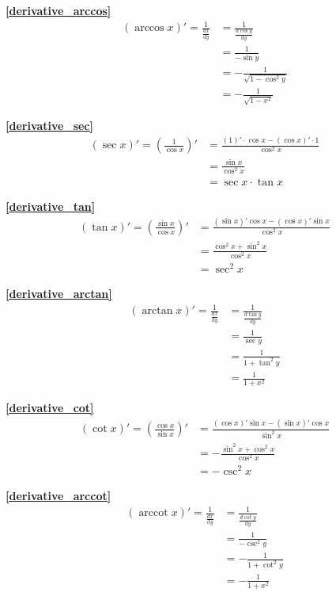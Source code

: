 \textbf{\large \ref{derivative_arccos}}
\begin{align*}
        (\arccos x)'=\frac{1}{\frac{dx}{\mathrm{d}{y}}}&=\frac{1}{\frac{d\cos y}{\mathrm{d}{y}}}\\
        &=\frac{1}{-\sin y}\\
        &=-\frac{1}{\sqrt{1-\cos^2 y}}\\
        &=-\frac{1}{\sqrt{1-x^2}}
\end{align*}

\textbf{\large \ref{derivative_sec}}
\begin{align*}
        (\sec x)'=\left(\frac{1}{\cos x}\right)'&=\frac{(1)'\cdot\cos x-(\cos x)'\cdot 1}{\cos^2x}\\
        &=\frac{\sin x}{\cos^2x}\\
        &=\sec x\cdot\tan x
\end{align*}

\textbf{\large \ref{derivative_tan}}
\begin{align*}
        (\tan x)'=\left(\frac{\sin x}{\cos x}\right)'&=\frac{(\sin x)'\cos x-(\cos x)'\sin x}{\cos^2x}\\
        &=\frac{\cos^2 x+\sin^2 x}{\cos^2x}\\
        &=\sec^2 x
\end{align*}

\textbf{\large \ref{derivative_arctan}}
\begin{align*}
        (\arctan x)'=\frac{1}{\frac{dx}{\mathrm{d}{y}}}&=\frac{1}{\frac{d\tan y}{\mathrm{d}{y}}}\\
        &=\frac{1}{\sec y}\\
        &=\frac{1}{1+\tan^2 y}\\
        &=\frac{1}{1+x^2}
\end{align*}

\textbf{\large \ref{derivative_cot}}
\begin{align*}
        (\cot x)'=\left(\frac{\cos x}{\sin x}\right)'&=\frac{(\cos x)'\sin x-(\sin x)'\cos x}{\sin^2x}\\
        &=-\frac{\sin^2 x+\cos^2 x}{\cos^2x}\\
        &=-\csc^2 x
\end{align*}

\textbf{\large \ref{derivative_arccot}}
\begin{align*}
        (\operatorname{arccot}{x})'=\frac{1}{\frac{dx}{\mathrm{d}{y}}}&=\frac{1}{\frac{d\cot y}{\mathrm{d}{y}}}\\
        &=\frac{1}{-\csc^2 y}\\
        &=-\frac{1}{1+\cot^2 y}\\
        &=-\frac{1}{1+x^2}
\end{align*}

